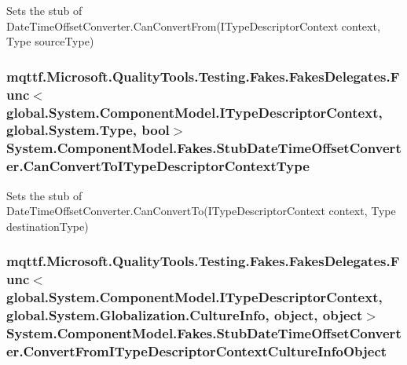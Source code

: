 Sets the stub of Date\-Time\-Offset\-Converter.\-Can\-Convert\-From(\-I\-Type\-Descriptor\-Context context, Type source\-Type)

\hypertarget{class_system_1_1_component_model_1_1_fakes_1_1_stub_date_time_offset_converter_a3748672e018f1e03df9ccc2a5800a804}{
\subsubsection[{Can\-Convert\-To\-I\-Type\-Descriptor\-Context\-Type}]{\setlength{\rightskip}{0pt plus 5cm}mqttf.\-Microsoft.\-Quality\-Tools.\-Testing.\-Fakes.\-Fakes\-Delegates.\-Func$<$global.\-System.\-Component\-Model.\-I\-Type\-Descriptor\-Context, global.\-System.\-Type, bool$>$ System.\-Component\-Model.\-Fakes.\-Stub\-Date\-Time\-Offset\-Converter.\-Can\-Convert\-To\-I\-Type\-Descriptor\-Context\-Type}}\label{class_system_1_1_component_model_1_1_fakes_1_1_stub_date_time_offset_converter_a3748672e018f1e03df9ccc2a5800a804}


Sets the stub of Date\-Time\-Offset\-Converter.\-Can\-Convert\-To(\-I\-Type\-Descriptor\-Context context, Type destination\-Type)

\hypertarget{class_system_1_1_component_model_1_1_fakes_1_1_stub_date_time_offset_converter_ad495384c530cd6d2c5269427c5638a1e}{
\subsubsection[{Convert\-From\-I\-Type\-Descriptor\-Context\-Culture\-Info\-Object}]{\setlength{\rightskip}{0pt plus 5cm}mqttf.\-Microsoft.\-Quality\-Tools.\-Testing.\-Fakes.\-Fakes\-Delegates.\-Func$<$global.\-System.\-Component\-Model.\-I\-Type\-Descriptor\-Context, global.\-System.\-Globalization.\-Culture\-Info, object, object$>$ System.\-Component\-Model.\-Fakes.\-Stub\-Date\-Time\-Offset\-Converter.\-Convert\-From\-I\-Type\-Descriptor\-Context\-Culture\-Info\-Object}}\label{class_system_1_1_component_model_1_1_fakes_1_1_stub_date_time_offset_converter_ad495384c530cd6d2c5269427c5638a1e}


